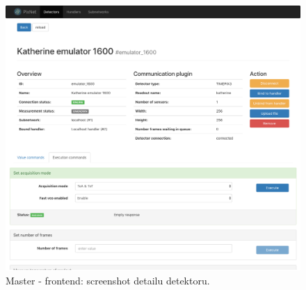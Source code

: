 \begin{figure}[h]
	\begin{center}
        \includegraphics[width=15cm]{figures/master_detector_detail.png}
	\end{center}
	\caption{Master - frontend: screenshot detailu detektoru.}
	\label{fig:master:frontend:detector_detail}
\end{figure}